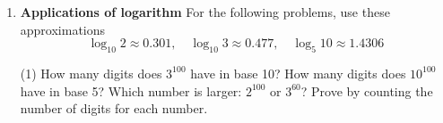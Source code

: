 \begin{enumerate}
\item \textbf{Applications of logarithm} For the following problems, use these approximations
\[\log_{10} 2 \approx 0.301, \quad \log_{10} 3 \approx 0.477, \quad \log_5 10 \approx 1.4306\]
\begin{tasks}[after-item-skip = 100pt, after-skip = 100pt](1)
\task How many digits does $3^{100}$ have in base 10?
\task How many digits does $10^{100}$ have in base 5?
\task Which number is larger: $2^{100}$ or $3^{60}$? Prove by counting the number of digits for each number.
\end{tasks}

\end{enumerate}